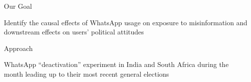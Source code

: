 \documentclass[usenames,dvipsnames,t]{beamer}
\begin{document}
\begin{frame}{Our Goal} \small  

\vspace*{\fill}

\centering
Identify the causal effects of WhatsApp usage on exposure to misinformation and downstream effects on users’ political attitudes 

\vspace*{\fill}

\end{frame}


\begin{frame}{Approach} \small  

\vspace*{\fill}

\centering
WhatsApp ``deactivation'' experiment in India and South Africa during the month leading up to their most recent general elections

\vspace*{\fill}

\end{frame}
\end{document}
